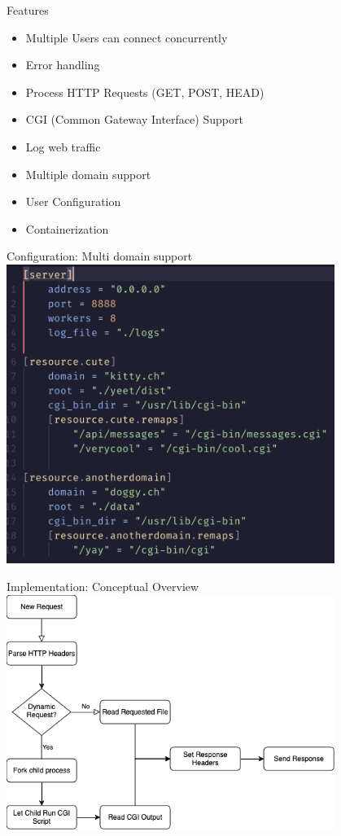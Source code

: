 \documentclass[aspectratio=169]{beamer}
\begin{document}
\begin{frame}[c]{Features}
   \begin{itemize}
       \item Multiple Users can connect concurrently 
       \item Error handling 
       \item Process HTTP Requests (GET, POST, HEAD)
       \item CGI (Common Gateway Interface) Support
       \item Log web traffic 
       \item Multiple domain support
       \item User Configuration
       \item Containerization
   \end{itemize} 
\end{frame}

\begin{frame}[c]{Configuration: Multi domain support}
    \centering
    \includegraphics[width=0.8\textwidth,height=0.8\textheight,keepaspectratio]{config.png}
\end{frame}

\begin{frame}[c]{Implementation: Conceptual Overview}
    \centering
    \includegraphics[width=0.8\textwidth,height=0.8\textheight,keepaspectratio]{web_server_inner_workings.png}
\end{frame}
\end{document}
